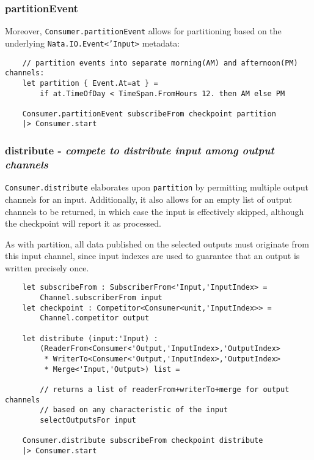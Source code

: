 \documentclass{article}
\begin{document}
\subsubsection{partitionEvent}

Moreover, \texttt{Consumer.partitionEvent} allows for partitioning based on the underlying \texttt{Nata.IO.Event<'Input>} metadata:

\begin{verbatim}
    // partition events into separate morning(AM) and afternoon(PM) channels:
    let partition { Event.At=at } =
        if at.TimeOfDay < TimeSpan.FromHours 12. then AM else PM

    Consumer.partitionEvent subscribeFrom checkpoint partition
    |> Consumer.start
\end{verbatim}

\subsubsection{distribute - \textit{compete to distribute input among output channels}}

\texttt{Consumer.distribute} elaborates upon \texttt{partition} by permitting multiple output channels for an input.  Additionally, it also allows for an empty list of output channels to be returned, in which case the input is effectively skipped, although the checkpoint will report it as processed.

As with partition, all data published on the selected outputs must originate from this input channel, since input indexes are used to guarantee that an output is written precisely once.

\begin{verbatim}
    let subscribeFrom : SubscriberFrom<'Input,'InputIndex> =
        Channel.subscriberFrom input
    let checkpoint : Competitor<Consumer<unit,'InputIndex>> =
        Channel.competitor output
    
    let distribute (input:'Input) :
        (ReaderFrom<Consumer<'Output,'InputIndex>,'OutputIndex>
         * WriterTo<Consumer<'Output,'InputIndex>,'OutputIndex>
         * Merge<'Input,'Output>) list =
        
        // returns a list of readerFrom+writerTo+merge for output channels
        // based on any characteristic of the input
        selectOutputsFor input
        
    Consumer.distribute subscribeFrom checkpoint distribute
    |> Consumer.start
\end{verbatim}
\end{document}
